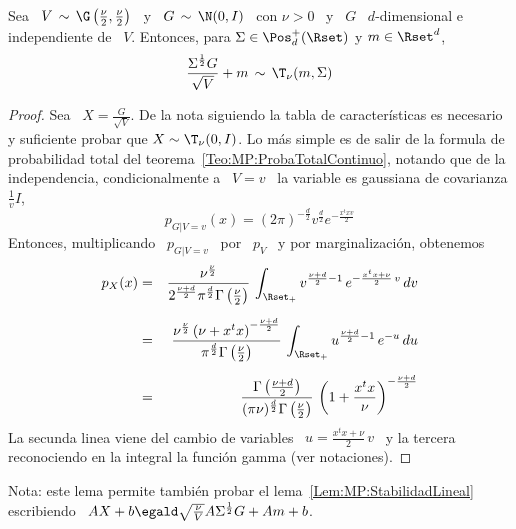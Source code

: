 \begin{lema}
\label{Lem:MP:MezclaGaussianaEscalaStudentT}
%
  Sea \ $V \,  \sim \, \G\left( \frac{\nu}{2} , \frac{\nu}{2} \right)$  \ y \ $G
  \,  \sim  \,  \N(0,I)$  \ con  $\nu  >  0$  \  y  \ $G$  \  $d$-dimensional  e
  independiente  de \ $V$.  Entonces, para  $\Sigma \in  \Pos_d^+(\Rset)$ y  $m \in
  \Rset^d$,
  \[
  \frac{\Sigma^{\frac12} G}{\sqrt{V}} + m  \, \sim \, \T_\nu(m,\Sigma)
  \]
\end{lema}
\begin{proof}
  Sea  \  $X   =  \frac{G}{\sqrt{V}}$.   De  la  nota   siguiendo  la  tabla  de
  caracter\'isticas es  necesario y suficiente probar que  $X \sim \T_\nu(0,I)$.
  Lo  m\'as  simple  es  de  salir  de la  formula  de  probabilidad  total  del
  teorema~\ref{Teo:MP:ProbaTotalContinuo},  notando  que  de  la  independencia,
  condicionalmente  a  \  $V=v$  \   la  variable  es  gaussiana  de  covarianza
  $\frac{1}{v} I$,
  \[
  p_{G|V=v}(x)  = (2  \pi)^{-\frac{d}{2}}  v^{\frac{d}{2}} e^{-  \frac{x^t x v}{2}}
  \]
  Entonces, multiplicando \ $p_{G|V=v}$ \ por \ $p_V$ \ y por marginalizaci\'on,
  obtenemos
  \begin{eqnarray*}
  p_X(x) & = & \frac{\nu^{\frac{\nu}{2}}}{2^{\frac{\nu+d}{2}} \pi^{\frac{d}{2}}
  \Gamma\left( \frac{\nu}{2} \right)} \, \int_{\Rset_+} v^{\frac{\nu+d}{2}-1} \,
  e^{- \frac{x^t x + \nu}{2} \, v} \, dv\\[2mm]
  & = & \frac{\nu^{\frac{\nu}{2}} \left( \nu + x^t x \right)^{-
  \frac{\nu+d}{2}}}{\pi^{\frac{d}{2}} \Gamma\left( \frac{\nu}{2} \right)} \,
  \int_{\Rset_+} u^{\frac{\nu+d}{2}-1} \, e^{- u} \, du\\[2mm]
  & = & \frac{\Gamma\left( \frac{\nu+d}{2} \right)}{(\pi \nu)^{\frac{d}{2}}
  \Gamma\left( \frac{\nu}{2} \right)} \, \left( 1 + \frac{x^t x}{\nu} \right)^{-
  \frac{\nu+d}{2}}
  \end{eqnarray*}
  La secunda linea viene del cambio de variables \ $u = \frac{x^t x + \nu}{2} \,
  v$  \  y la  tercera  reconociendo  en la  integral  la  funci\'on gamma  (ver
  notaciones).
\end{proof}
%
Nota: este  lema permite tambi\'en  probar el lema~\ref{Lem:MP:StabilidadLineal}
escribiendo \ $A X + b \egald  \sqrt{\frac{\nu}{V}} A \Sigma^{\frac12} G + A m +
b$.

